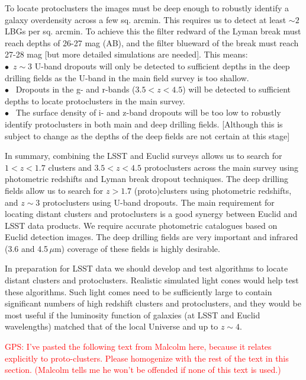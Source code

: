 \documentclass[a4paper,11pt]{article}
\newcommand{\red}{\textcolor{red}}
\begin{document}
To locate protoclusters the images must be deep enough to robustly
identify a galaxy overdensity across a few sq. arcmin. This requires
us to detect at least $\sim2$ LBGs per sq. arcmin. To achieve this the
filter redward of the Lyman break must reach depths of 26-27 mag (AB),
and the filter blueward of the break must reach 27-28 mag [but more
  detailed simulations are needed]. This means:\\
\noindent $\bullet$~$z\sim3$ U-band dropouts will only be detected to
sufficient depths in the deep drilling fields as the U-band in the
main field survey is too shallow. \\
\noindent $\bullet$ ~Dropouts in the g- and r-bands ($3.5<z<4.5$) will
be detected to sufficient depths to locate protoclusters in the main
survey. \\
\noindent $\bullet$ ~The surface density of i- and z-band dropouts
will be too low to robustly identify protoclusters in both main and
deep drilling fields. [Although this is subject to change as the
  depths of the deep fields are not certain at this stage]

In summary, combining the LSST and Euclid surveys allows us to search
for $1<z<1.7$ clusters and $3.5<z<4.5$ protoclusters across the main
survey using photometric redshifts and Lyman break dropout
techniques. The deep drilling fields allow us to search for $z>1.7$
(proto)clusters using photometric redshifts, and $z\sim3$
protoclusters using U-band dropouts. The main requirement for locating
distant clusters and protoclusters is a good synergy between Euclid
and LSST data products. We require accurate photometric catalogues
based on Euclid detection images. The deep drilling fields are very
important and infrared (3.6 and 4.5\,$\mu$m) coverage of these fields
is highly desirable.

In preparation for LSST data we should develop and test algorithms to
locate distant clusters and protoclusters. Realistic simulated light
cones would help test these algorithms. Such light comes need to be
sufficiently large to contain significant numbers of high redshift
clusters and protoclusters, and they would be most useful if the
luminosity function of galaxies (at LSST and Euclid wavelengths)
matched that of the local Universe and up to $z\sim4$.

\noindent\red{GPS: I've pasted the following text from Malcolm here,
  because it relates explicitly to proto-clusters.  Please homogenize
  with the rest of the text in this section.  (Malcolm tells me he
  won't be offended if none of this text is used.)}
\end{document}
